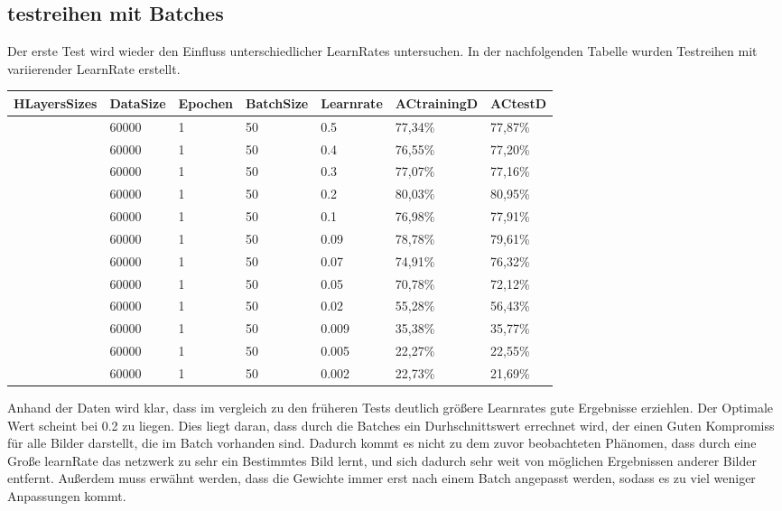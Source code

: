 \documentclass[12pt]{article}
\begin{document}
\subsection{testreihen mit Batches}
Der erste Test wird wieder den Einfluss unterschiedlicher LearnRates untersuchen.
In der nachfolgenden Tabelle wurden Testreihen mit variierender LearnRate erstellt. 
\begin{table}[H]
    \centering
    \begin{tabular}{|l|l|l|l|l|l|l|}
    \hline
        HLayersSizes & DataSize & Epochen & BatchSize & Learnrate & ACtrainingD & ACtestD \\ \hline
        [784, 100, 10] & 60000 & 1 & 50 & 0.5 & 77,34\% & 77,87\% \\ \hline
        [784, 100, 10] & 60000 & 1 & 50 & 0.4 & 76,55\% & 77,20\% \\ \hline
        [784, 100, 10] & 60000 & 1 & 50 & 0.3 & 77,07\% & 77,16\% \\ \hline
        [784, 100, 10] & 60000 & 1 & 50 & 0.2 & 80,03\% & 80,95\% \\ \hline
        [784, 100, 10] & 60000 & 1 & 50 & 0.1 & 76,98\% & 77,91\% \\ \hline
        [784, 100, 10] & 60000 & 1 & 50 & 0.09 & 78,78\% & 79,61\% \\ \hline
        [784, 100, 10] & 60000 & 1 & 50 & 0.07 & 74,91\% & 76,32\% \\ \hline
        [784, 100, 10] & 60000 & 1 & 50 & 0.05 & 70,78\% & 72,12\% \\ \hline
        [784, 100, 10] & 60000 & 1 & 50 & 0.02 & 55,28\% & 56,43\% \\ \hline
        [784, 100, 10] & 60000 & 1 & 50 & 0.009 & 35,38\% & 35,77\% \\ \hline
        [784, 100, 10] & 60000 & 1 & 50 & 0.005 & 22,27\% & 22,55\% \\ \hline
        [784, 100, 10] & 60000 & 1 & 50 & 0.002 & 22,73\% & 21,69\% \\ \hline
    \end{tabular}
\end{table}
Anhand der Daten wird klar, dass im vergleich zu den früheren Tests deutlich größere Learnrates gute Ergebnisse erziehlen. Der Optimale Wert scheint bei 0.2 zu liegen. Dies liegt daran, dass durch die Batches ein Durhschnittswert errechnet wird, der einen Guten Kompromiss für alle Bilder darstellt, die im Batch vorhanden sind. Dadurch kommt es nicht zu dem zuvor beobachteten Phänomen, dass durch eine Große learnRate das netzwerk zu sehr ein Bestimmtes Bild lernt, und sich dadurch sehr weit von möglichen Ergebnissen anderer Bilder entfernt. Außerdem muss erwähnt werden, dass die Gewichte immer erst nach einem Batch angepasst werden, sodass es zu viel weniger Anpassungen kommt. 
\end{document}
